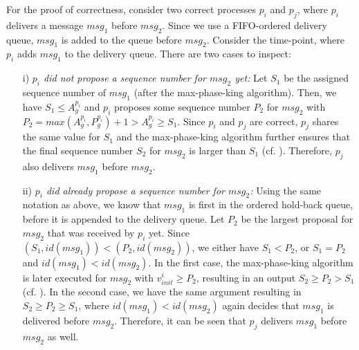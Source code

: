 \documentclass[runningheads]{llncs}
\begin{document}
For the proof of correctness, consider two correct processes $p_i$ and $p_j$, where $p_i$ delivers a message $msg_1$ before $msg_2$. Since we use a FIFO-ordered delivery queue, $msg_1$ is added to the queue before $msg_2$. Consider the time-point, where $p_i$ adds $msg_1$ to the delivery queue. There are two cases to inspect:
\begin{enumerate}
    \item[i)] \textit{$p_i$ did not propose a sequence number for $msg_2$ yet:} Let $S_1$ be the assigned sequence number of $msg_1$ (after the max-phase-king algorithm). Then, we have $S_1 \leq A_g^{p_i}$ and $p_i$ proposes some sequence number $P_2$ for $msg_2$ with $P_2 = max(A_g^{p_i}, P_g^{p_i})+1 > A_g^{p_i} \geq S_1$. Since $p_i$ and $p_j$ are correct, $p_j$ shares the same value for $S_1$ and the max-phase-king algorithm further ensures that the final sequence number $S_2$ for $msg_2$ is larger than $S_1$ (cf. ). Therefore, $p_j$ also delivers $msg_1$ before $msg_2$.
    \item[ii)] \textit{$p_i$ did already propose a sequence number for $msg_2$:} Using the same notation as above, we know that $msg_1$ is first in the ordered hold-back queue, before it is appended to the delivery queue. Let $P_2$ be the largest proposal for $msg_2$ that was received by $p_i$ yet. Since $(S_1, id(msg_1)) < (P_2, id(msg_2))$, we either have $S_1 < P_2$, or $S_1 = P_2$ and $id(msg_1) < id(msg_2)$. In the first case, the max-phase-king algorithm is later executed for $msg_2$ with $v_{init}^i \geq P_2$, resulting in an output $S_2 \geq P_2 > S_1$ (cf. ). In the second case, we have the same argument resulting in $S_2 \geq P_2 \geq S_1$, where $id(msg_1) < id(msg_2)$ again decides that $msg_1$ is delivered before $msg_2$. Therefore, it can be seen that $p_j$ delivers $msg_1$ before $msg_2$ as well.
\end{enumerate}
\end{document}

